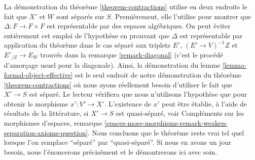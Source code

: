 \begin{remark}
\label{remark-separated-needed}
La démonstration du théorème \ref{theorem-contractions} utilise en deux endroits le fait que $X'$ et $W$
sont séparés sur $S$. Premièrement, elle l'utilise pour montrer que
$\Delta : F \to F \times F$ est représentable par des espaces algébriques.
On peut éviter entièrement cet emploi de l'hypothèse en prouvant
que $\Delta$ est représentable par application du théorème dans le cas
séparé aux triplets
$E'$, $(E' \to V)^{-1}Z$ et $E'_{/Z} \to E_W$
trouvés dans la remarque \ref{remark-diagonal} (c'est le procédé d'amorçage
usuel pour la diagonale). Ainsi, la démonstration du
lemme \ref{lemma-formal-object-effective} est le seul
endroit de notre démonstration du théorème \ref{theorem-contractions}
où nous ayons réellement besoin d'utiliser le fait que $X' \to S$ est séparé.
Le lecteur vérifiera que nous n'utilisons l'hypothèse que pour obtenir
le morphisme $x' : V' \to X'$. L'existence de $x'$ peut être établie,
à l'aide de résultats de la littérature, si $X' \to S$ est quasi-séparé, voir
Compléments sur les morphismes d'espaces, remarque
\ref{spaces-more-morphisms-remark-weaken-separation-axioms-question}.
Nous concluons que le théorème reste vrai tel quel lorsque l'on remplace
``séparé'' par ``quasi-séparé''. Si nous en avons un jour besoin,
nous l'énoncerons précisément et le démontrerons ici avec soin.
\end{remark}





















